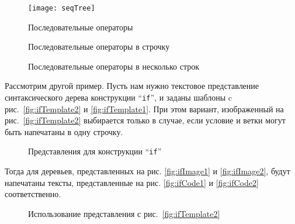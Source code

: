 \begin{figure}[h!]
	\centering
	\texttt{[image: seqTree]}
	\caption{Последовательные операторы}
	\label{fig:seqImage}
\end{figure}

\begin{figure}[h!]
	\centering
	
	\caption{Последовательные операторы в строчку}
	\label{fig:seqCode1}
\end{figure}

\begin{figure}[h!]
	\centering
	
	\caption{Последовательные операторы в несколько строк}
	\label{fig:seqCode2}
\end{figure}


Рассмотрим другой пример.
Пусть нам нужно текстовое представление синтаксического дерева конструкции
“\lstinline{if}”, и заданы шаблоны c рис.~\ref{fig:ifTemplate2} и
\ref{fig:ifTemplate1}. При этом вариант, изображенный на
рис.~\ref{fig:ifTemplate2} выбирается только в случае, если условие и
ветки могут быть напечатаны в одну строчку.

\begin{figure}[h!]
	\subfloat[]{
		
		\label{fig:ifTemplate2}	
	}
	\quad
	\subfloat[]{
		
		\label{fig:ifTemplate1}	
	}
	\caption{Представления для конструкции “\lstinline{if}”}
	\label{fig:ifTemplateEx}	
\end{figure}


Тогда для деревьев, представленных на рис.
\ref{fig:ifImage1} и \ref{fig:ifImage2}, будут напечатаны тексты, представленные на
рис. \ref{fig:ifCode1} и \ref{fig:ifCode2} соответственно.

\begin{figure}[h!]
\centering
	\subfloat[]{
		\centering
		\texttt{[image: if1]}
		\label{fig:ifImage1}
	}
	\quad
	\subfloat[]{
		\centering
		
		\label{fig:ifCode1}	
	}

	\caption{Использование представления с рис.~\ref{fig:ifTemplate2}}
\end{figure}


